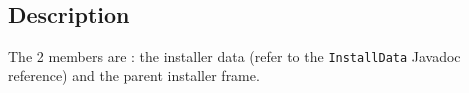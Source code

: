 \begin{center}
\end{center}\

\subsection{Description}

The 2 members are : the installer data (refer to the \texttt{InstallData}
Javadoc reference) and the parent installer frame.\\

